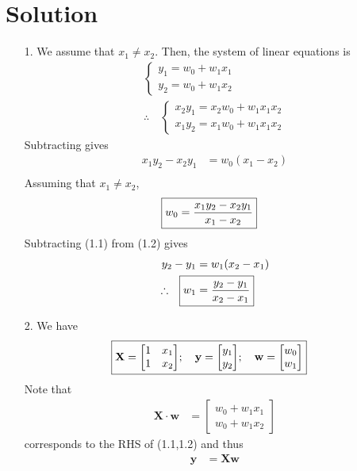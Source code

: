 \documentclass{harvardml}
\theoremstyle{definition}
\theoremstyle{plain}
\newenvironment{solution}
  {\color{blue}\section*{Solution}}
{}
\begin{document}
\begin{solution}

\begin{enumerate}
    \item [1.] We assume that $x_1 \neq x_2$. Then, the system of linear equations is
    \begin{align*}
    \begin{cases}
        y_1 = w_0 + w_1 x_1 \\
        y_2 = w_0 + w_1 x_2
    \end{cases} \tag*{(1.1,1.2)} \\
    \therefore \quad \begin{cases}
        x_2y_1 = x_2w_0 + w_1x_1x_2 \\
        x_1y_2 = x_1w_0 + w_1x_1x_2
    \end{cases}
    \end{align*}
    Subtracting gives
    \begin{align*}
        x_1y_2 - x_2y_1 &= w_0(x_1-x_2) \\
    \end{align*}
    Assuming that $x_1 \neq x_2$,
    \begin{align*}
        \Aboxed{ w_0 &= \frac{ x_1y_2 - x_2y_1 }{x_1 - x_2} }
    \end{align*}
    Subtracting (1.1) from (1.2) gives
    \begin{align*}
        y_2 - y_1 &= w_1(x_2 - x_1) \\
        \therefore \quad \Aboxed{ w_1 &= \frac{y_2 - y_1}{x_2 - x_1} }
    \end{align*}


    \item[2.] We have
    \begin{align*}
        \Aboxed { \mathbf{X} &= {\begin{bmatrix}
            1 & x_1 \\
            1 & x_2
        \end{bmatrix}}; \quad
        \mathbf{y} = {\begin{bmatrix}
            y_1 \\
            y_2
        \end{bmatrix}}; \quad
        \mathbf{w} = {\begin{bmatrix}
            w_0 \\
            w_1
        \end{bmatrix}} }
    \end{align*}
    Note that
    \begin{align*}
        \mathbf{X} \cdot \mathbf{w} &= \begin{bmatrix}
            w_0 + w_1x_1 \\
            w_0 + w_1x_2
        \end{bmatrix}
    \end{align*}
    corresponds to the RHS of (1.1,1.2) and thus
    \begin{align*}
        \mathbf{y} &= \mathbf{X} \mathbf{w} \tag*{(1.3)}
    \end{align*}


\end{enumerate}
\end{solution}
\end{document}
